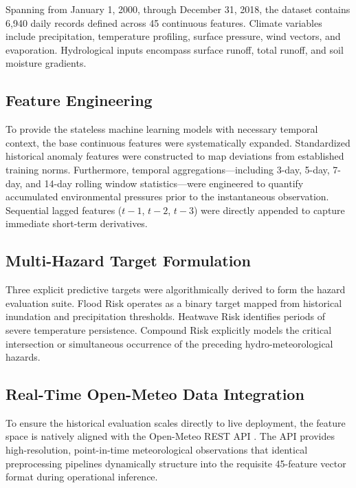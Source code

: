 Spanning from January 1, 2000, through December 31, 2018, the dataset contains 6,940 daily records defined across 45 continuous features. Climate variables include precipitation, temperature profiling, surface pressure, wind vectors, and evaporation. Hydrological inputs encompass surface runoff, total runoff, and soil moisture gradients.

\subsection{Feature Engineering}
To provide the stateless machine learning models with necessary temporal context, the base continuous features were systematically expanded. Standardized historical anomaly features were constructed to map deviations from established training norms. Furthermore, temporal aggregations---including 3-day, 5-day, 7-day, and 14-day rolling window statistics---were engineered to quantify accumulated environmental pressures prior to the instantaneous observation. Sequential lagged features ($t-1$, $t-2$, $t-3$) were directly appended to capture immediate short-term derivatives. 

\subsection{Multi-Hazard Target Formulation}
Three explicit predictive targets were algorithmically derived to form the hazard evaluation suite. Flood Risk operates as a binary target mapped from historical inundation and precipitation thresholds. Heatwave Risk identifies periods of severe temperature persistence. Compound Risk explicitly models the critical intersection or simultaneous occurrence of the preceding hydro-meteorological hazards. 

\subsection{Real-Time Open-Meteo Data Integration}
To ensure the historical evaluation scales directly to live deployment, the feature space is natively aligned with the Open-Meteo REST API \cite{OpenMeteo2023}. The API provides high-resolution, point-in-time meteorological observations that identical preprocessing pipelines dynamically structure into the requisite 45-feature vector format during operational inference.
